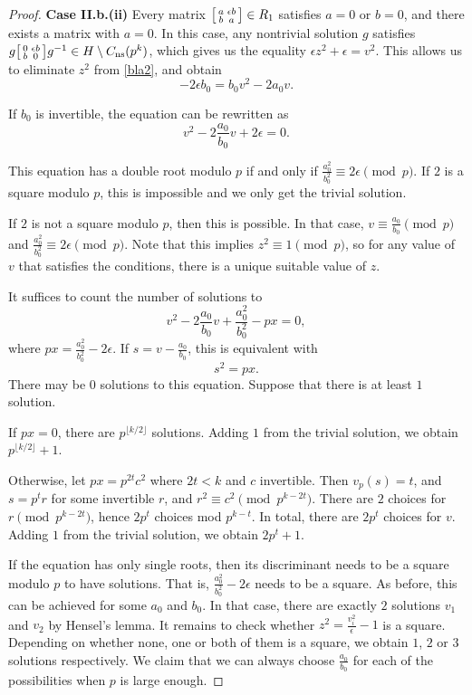 \documentclass[10pt,leqno]{amsart}
\newcommand\sm[1]{\begin{bsmallmatrix}#1\end{bsmallmatrix}}
\theoremstyle{definition}
\theoremstyle{remark}
\numberwithin{theorem}{section}
\begin{document}
\begin{proof}
\noindent \textbf{Case II.b.(ii)} Every matrix $\sm{a & \epsilon b \\ b & a}\in R_1$ satisfies $a=0$ or $b=0$, and there exists a matrix with $a=0$. In this case, any nontrivial solution $g$ satisfies $g \sm{0 & \epsilon b \\ b & 0}g^{-1}\in H\setminus C_{\mathrm{ns}}(p^k)$, which gives us the equality
$\epsilon z^2+\epsilon =v^2$. This allows us to eliminate $z^2$ from \eqref{bla2}, and obtain $$-2\epsilon b_0=b_0 v^2-2a_0v.$$

If $b_0$ is invertible, the equation can be rewritten as $$v^2-2\frac{a_0}{b_0}v+2\epsilon=0.$$

This equation has a double root modulo $p$ if and only if $\frac{a_0^2}{b_0^2}\equiv 2\epsilon \pmod p$. If $2$ is a square modulo $p$, this is impossible and we only get the trivial solution. 

If $2$ is not a square modulo $p$, then this is possible. In that case, $v\equiv \frac{a_0}{b_0} \pmod p$ and $\frac{a_0^2}{b_0^2}\equiv 2\epsilon \pmod p$. Note that this implies $z^2\equiv 1 \pmod p$, so for any value of $v$ that satisfies the conditions, there is a unique suitable value of $z$.

It suffices to count the number of solutions to $$v^2-2\frac{a_0}{b_0}v+\frac{a_0^2}{b_0^2}-px=0,$$ where $p x=\frac{a_0^2}{b_0^2}-2\epsilon$. If $s=v-\frac{a_0}{b_0}$, this is equivalent with $$s^2=px.$$
There may be $0$ solutions to this equation. Suppose that there is at least $1$ solution. 

If $px=0$, there are $p^{\lfloor k/2 \rfloor}$ solutions. Adding $1$ from the trivial solution, we obtain $p^{\lfloor k/2 \rfloor}+1$. 

Otherwise, let $px=p^{2t}c^2$ where $2t<k$ and $c$ invertible. Then $v_p(s)=t$, and $s=p^t r$ for some invertible $r$, and $r^2\equiv c^2 \pmod p^{k-2t}$. There are $2$ choices for $r \pmod {p^{k-2t}}$, hence $2p^{t}$ choices mod $p^{k-t}$. In total, there are $2p^{t}$ choices for $v$. Adding $1$ from the trivial solution, we obtain $2p^t+1$.

If the equation has only single roots, then its discriminant needs to be a square modulo $p$ to have solutions. That is, $\frac{a_0^2}{b_0^2}-2\epsilon$ needs to be a square. As before, this can be achieved for some $a_0$ and $b_0$.  In that case, there are exactly $2$ solutions $v_1$ and $v_2$ by Hensel's lemma. It remains to check whether $z^2=\frac{v_i^2}{\epsilon}-1$ is a square. Depending on whether none, one or both of them is a square, we obtain $1$, $2$ or $3$ solutions respectively. We claim that we can always choose $\frac{a_0}{b_0}$ for each of the possibilities when $p$ is large enough. 


\end{proof}
\end{document}
